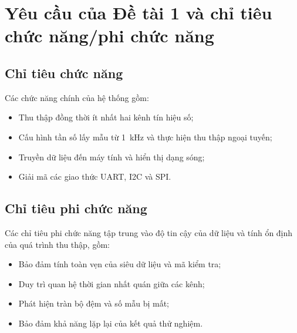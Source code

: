 \section{Yêu cầu của Đề tài 1 và chỉ tiêu chức năng/phi chức năng}\label{sec:requirements}

\subsection{Chỉ tiêu chức năng}
Các chức năng chính của hệ thống gồm:
\begin{itemize}
\item Thu thập đồng thời ít nhất hai kênh tín hiệu số;
\item Cấu hình tần số lấy mẫu từ 1~kHz và thực hiện thu thập ngoại tuyến;
\item Truyền dữ liệu đến máy tính và hiển thị dạng sóng;
\item Giải mã các giao thức UART, I2C và SPI.
\end{itemize}

\subsection{Chỉ tiêu phi chức năng}
Các chỉ tiêu phi chức năng tập trung vào độ tin cậy của dữ liệu và tính ổn định của quá trình thu thập, gồm:
\begin{itemize}
\item Bảo đảm tính toàn vẹn của siêu dữ liệu và mã kiểm tra;
\item Duy trì quan hệ thời gian nhất quán giữa các kênh;
\item Phát hiện tràn bộ đệm và số mẫu bị mất;
\item Bảo đảm khả năng lặp lại của kết quả thử nghiệm.
\end{itemize}

